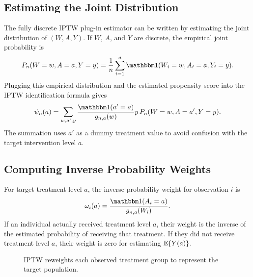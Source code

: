\subsection{Estimating the Joint Distribution}

The fully discrete IPTW plug-in estimator can be written by estimating the joint
distribution of $(W,A,Y)$. If $W$, $A$, and $Y$ are discrete, the empirical joint
probability is
\[
P_n(W=w,A=a,Y=y)
=
\frac{1}{n}\sum_{i=1}^n \ind(W_i=w,A_i=a,Y_i=y).
\]
Plugging this empirical distribution and the estimated propensity score into the IPTW
identification formula gives
\[
\psi_n(a)
=
\sum_{w,a',y}
\frac{\ind(a'=a)}{g_{n,a}(w)}
y\,P_n(W=w,A=a',Y=y).
\]
The summation uses $a'$ as a dummy treatment value to avoid confusion with the target
intervention level $a$.

\subsection{Computing Inverse Probability Weights}

For target treatment level $a$, the inverse probability weight for observation $i$ is
\[
\omega_i(a)=\frac{\ind(A_i=a)}{g_{n,a}(W_i)}.
\]
If an individual actually received treatment level $a$, their weight is the inverse of
the estimated probability of receiving that treatment. If they did not receive
treatment level $a$, their weight is zero for estimating $\mathbb{E}\{Y(a)\}$.

\begin{figure}[H]
\centering
{}
\caption{IPTW reweights each observed treatment group to represent the target population.}
\label{fig:ch4-iptw-reweighting}
\end{figure}

